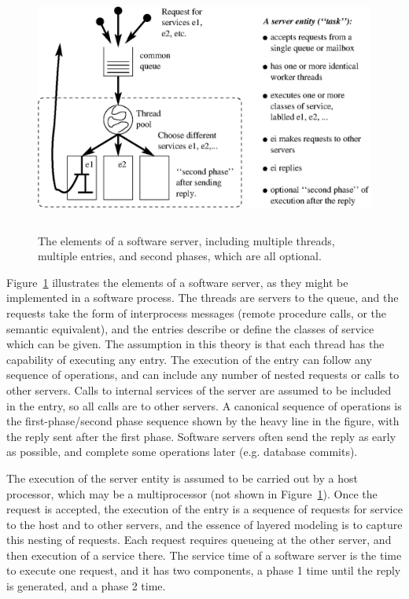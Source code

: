 \documentclass[11pt]{article}
\begin{document}
\begin{figure}[h]
  \centering
  \includegraphics[height=3.25in]{model/elements.eps}
  \caption{The elements of a software server, including multiple
  threads, multiple entries, and second phases, which are all
  optional.} 
  \label{fig:elements}
\end{figure}

Figure~\ref{fig:elements} illustrates the elements of a software
server, as they might be implemented in a software process. The
threads are servers to the queue, and the requests take the form of
interprocess messages (remote procedure calls, or the semantic
equivalent), and the entries describe or define the classes of service
which can be given. The assumption in this theory is that each thread
has the capability of executing any entry.  The execution of the entry
can follow any sequence of operations, and can include any number of
nested requests or calls to other servers. Calls to internal services
of the server are assumed to be included in the entry, so all calls
are to other servers. A canonical sequence of operations is the
first-phase/second phase sequence shown by the heavy line in the
figure, with the reply sent after the first phase. Software servers
often send the reply as early as possible, and complete some
operations later (e.g. database commits).

The execution of the server entity is assumed to be carried out by a host processor, which may
be a multiprocessor (not shown in Figure~\ref{fig:elements}). Once the request is accepted, the
execution of the entry is a sequence of requests for service to the host and to other servers, and the essence of layered modeling is to capture this 
nesting of requests. Each request requires queueing at the other server, and then execution of a 
service there. The service time of a software server is the time to execute one request, and it has two 
components, a phase 1 time until the reply is generated, and a phase 2 time.
\end{document}
